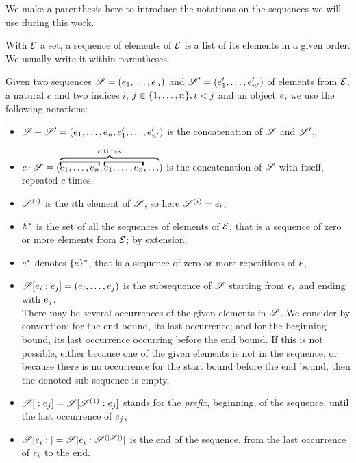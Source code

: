 We make a parenthesis here to introduce the notations on the sequences we will use during this work.

With $\mathcal{E}$ a set, a sequence of elements of $\mathcal{E}$ is a list of its elements in a given order.
We usually write it within parentheses.

Given two sequences $\defSeq{1}{n}$ and $\defSeq[\seq'][\sit']{1}{n'}$ of elements from $\mathcal{E}$, a natural $c$ and two indices $i$, $j \in \{1, \dots, n\}, i < j$ and an object $e$, we use the following notations:
\begin{itemize}
  \item $\seq \concat \seq' = (\elemsSeq{1}{n}, \elemsSeq[\sit']{1}{n'})$ is the concatenation of $\seq$ and $\seq'$,
  \item $c \cdot \seq = (\overbrace{\overbracket{\elemsSeq{1}{n}}, \overbracket{\elemsSeq{1}{n}}, {\dots}}^{c \text{ times}})$ is the concatenation of $\seq$ with itself, repeated $c$ times,
  \item $\seq[i]$ is the $i$th element of $\seq$, so here $\seq[i] = \sit_i$, 
  \item $\mathcal{E}^*$ is the set of all the sequences of elements of $\mathcal{E}$, that is a sequence of zero or more elements from $\mathcal{E}$; by extension,
  \item $e^*$ denotes $\{e\}^*$, that is a sequence of zero or more repetitions of $e$,
  \item $\slice{\sit_i}{\sit_j} = \bodySeq{i}{j}$ is the subsequence of $\seq$ starting from $e_i$ and ending with $e_j$.\\
    There may be several occurrences of the given elements in $\seq$.
    We consider by convention: for the end bound, its last occurrence; and for the beginning bound, its last occurrence occurring before the end bound.
    If this is not possible, either because one of the given elements is not in the sequence, or because there is no occurrence for the start bound before the end bound, then the denoted sub-sequence is empty,
  \item $\slice{}{\sit_j} = \slice{\seq[1]}{\sit_j}$ stands for the \emph{prefix}, \ie beginning, of the sequence, until the last occurrence of $e_j$,
  \item $\slice{\sit_i}{} = \slice{\sit_i}{\seq[\card{\seq}]}$ is the end of the sequence, from the last occurrence of $e_i$ to the end.
\end{itemize}
